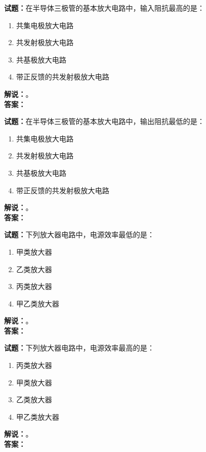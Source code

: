 \documentclass{ctexbook}
\begin{document}
\vspace{\baselineskip}

\noindent\textbf{试题：}在半导体三极管的基本放大电路中，输入阻抗最高的是：
\begin{enumerate}[leftmargin=3em]
  \item 共集电极放大电路
  \item 共发射极放大电路
  \item 共基极放大电路
  \item 带正反馈的共发射极放大电路
\end{enumerate}
\noindent\textbf{解说：}\textbf{}。\\\noindent\textbf{答案：}

\vspace{\baselineskip}

\noindent\textbf{试题：}在半导体三极管的基本放大电路中，输出阻抗最低的是：
\begin{enumerate}[leftmargin=3em]
  \item 共集电极放大电路
  \item 共发射极放大电路
  \item 共基极放大电路
  \item 带正反馈的共发射极放大电路
\end{enumerate}
\noindent\textbf{解说：}\textbf{}。\\\noindent\textbf{答案：}

\vspace{\baselineskip}

\noindent\textbf{试题：}下列放大器电路中，电源效率最低的是：
\begin{enumerate}[leftmargin=3em]
  \item 甲类放大器
  \item 乙类放大器
  \item 丙类放大器
  \item 甲乙类放大器
\end{enumerate}
\noindent\textbf{解说：}\textbf{}。\\\noindent\textbf{答案：}

\vspace{\baselineskip}

\noindent\textbf{试题：}下列放大器电路中，电源效率最高的是：
\begin{enumerate}[leftmargin=3em]
  \item 丙类放大器
  \item 甲类放大器
  \item 乙类放大器
  \item 甲乙类放大器
\end{enumerate}
\noindent\textbf{解说：}\textbf{}。\\\noindent\textbf{答案：}
\end{document}
